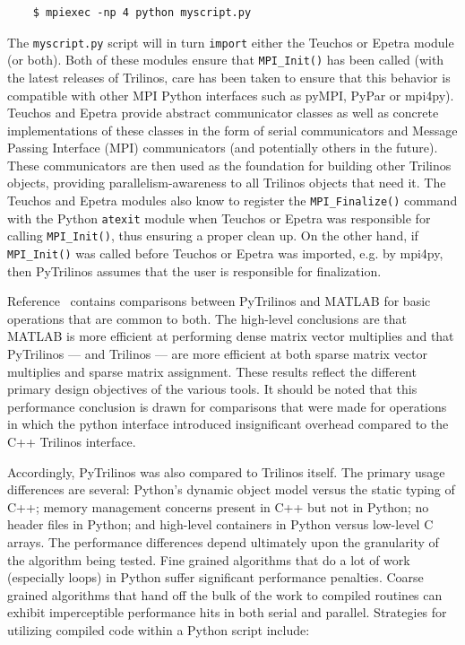 \documentclass[11pt]{article}
\begin{document}
\begin{verbatim}
    $ mpiexec -np 4 python myscript.py
\end{verbatim}

The {\tt myscript.py} script will in turn {\tt import} either the Teuchos or Epetra module (or both).  Both of these modules ensure that {\tt MPI\_Init()} has been called (with the latest releases of Trilinos, care has been taken to ensure that this behavior is compatible with other MPI Python interfaces such as pyMPI, PyPar or mpi4py).  Teuchos and Epetra provide abstract communicator classes as well as concrete implementations of these classes in the form of serial communicators and Message Passing Interface (MPI) communicators (and potentially others in the future).  These communicators are then used as the foundation for building other Trilinos objects, providing parallelism-awareness to all Trilinos objects that need it.  The Teuchos and Epetra modules also know to register the {\tt MPI\_Finalize()} command with the Python {\tt atexit} module when Teuchos or Epetra was responsible for calling {\tt MPI\_Init()}, thus ensuring a proper clean up.  On the other hand, if {\tt MPI\_Init()} was called before Teuchos or Epetra was imported, e.g. by mpi4py, then PyTrilinos assumes that the user is responsible for finalization.

Reference~\cite{PyTrilinos} contains comparisons between PyTrilinos and MATLAB for basic operations that are common to both.  The high-level conclusions are that MATLAB is more efficient at performing dense matrix vector multiplies and that PyTrilinos --- and Trilinos --- are more efficient at both sparse matrix vector multiplies and sparse matrix assignment.  These results reflect the different primary design objectives of the various tools.  It should be noted that this performance conclusion is drawn for comparisons that were made for operations in which the python interface introduced insignificant overhead compared to the C++ Trilinos interface.

Accordingly, PyTrilinos was also compared to Trilinos itself.  The primary usage differences are several: Python's dynamic object model versus the static typing of C++; memory management concerns present in C++ but not in Python; no header files in Python; and high-level containers in Python versus low-level C arrays.  The performance differences depend ultimately upon the granularity of the algorithm being tested.  Fine grained algorithms that do a lot of work (especially loops) in Python suffer significant performance penalties.  Coarse grained algorithms that hand off the bulk of the work to compiled routines can exhibit imperceptible performance hits in both serial and parallel.  Strategies for utilizing compiled code within a Python script include:
\end{document}
